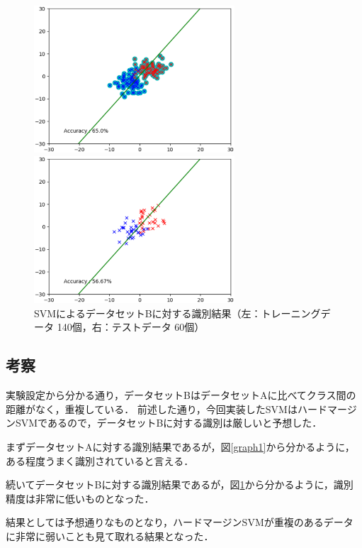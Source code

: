 \begin{figure}[H]
    \begin{minipage}{0.5\hsize}
        \begin{center}
            \includegraphics[width=75mm]{./figures/task1/Figure_200_train_fail.eps}
        \end{center}
    \end{minipage}
    \begin{minipage}{0.5\hsize}
        \begin{center}
            \includegraphics[width=75mm]{./figures/task1/Figure_200_test_fail.eps}
        \end{center}
    \end{minipage}
    \caption{SVMによるデータセットBに対する識別結果（左：トレーニングデータ 140個，右：テストデータ 60個）}
    \label{graph2}
\end{figure}

\subsection*{考察}
実験設定から分かる通り，データセットBはデータセットAに比べてクラス間の距離がなく，重複している．
前述した通り，今回実装したSVMはハードマージンSVMであるので，データセットBに対する識別は厳しいと予想した．\par
まずデータセットAに対する識別結果であるが，図\ref{graph1}から分かるように，ある程度うまく識別されていると言える．\par
続いてデータセットBに対する識別結果であるが，図\ref{graph2}から分かるように，識別精度は非常に低いものとなった．\par
結果としては予想通りなものとなり，ハードマージンSVMが重複のあるデータに非常に弱いことも見て取れる結果となった．
